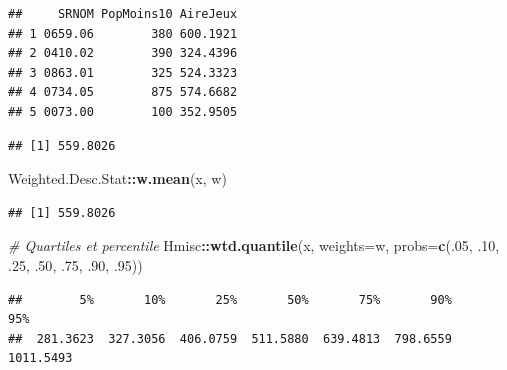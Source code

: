 \documentclass[
  11pt,
  french,
]{book}
\makeatletter
\newenvironment{Shaded}{\begin{snugshade}}{\end{snugshade}}
\newcommand{\CommentTok}[1]{\textcolor[rgb]{0.56,0.35,0.01}{\textit{#1}}}
\newcommand{\DataTypeTok}[1]{\textcolor[rgb]{0.13,0.29,0.53}{#1}}
\newcommand{\DecValTok}[1]{\textcolor[rgb]{0.00,0.00,0.81}{#1}}
\newcommand{\FloatTok}[1]{\textcolor[rgb]{0.00,0.00,0.81}{#1}}
\newcommand{\KeywordTok}[1]{\textcolor[rgb]{0.13,0.29,0.53}{\textbf{#1}}}
\newcommand{\NormalTok}[1]{#1}
\newcommand{\OperatorTok}[1]{\textcolor[rgb]{0.81,0.36,0.00}{\textbf{#1}}}
\newcommand{\StringTok}[1]{\textcolor[rgb]{0.31,0.60,0.02}{#1}}
\newenvironment{kframe}{%
\medskip{}
\setlength{\fboxsep}{.8em}
 \def\at@end@of@kframe{}%
 \ifinner\ifhmode%
  \def\at@end@of@kframe{\end{minipage}}%
  \begin{minipage}{\columnwidth}%
 \fi\fi%
 \def\FrameCommand##1{\hskip\@totalleftmargin \hskip-\fboxsep
 \colorbox{shadecolor}{##1}\hskip-\fboxsep
     \hskip-\linewidth \hskip-\@totalleftmargin \hskip\columnwidth}%
 \MakeFramed {\advance\hsize-\width
   \@totalleftmargin\z@ \linewidth\hsize
   \@setminipage}}%
 {\par\unskip\endMakeFramed%
 \at@end@of@kframe}
\renewenvironment{Shaded}{\begin{kframe}}{\end{kframe}}
\makeatother
\begin{document}
\begin{verbatim}
##     SRNOM PopMoins10 AireJeux
## 1 0659.06        380 600.1921
## 2 0410.02        390 324.4396
## 3 0863.01        325 524.3323
## 4 0734.05        875 574.6682
## 5 0073.00        100 352.9505
\end{verbatim}

\begin{Shaded}
\end{Shaded}

\begin{verbatim}
## [1] 559.8026
\end{verbatim}

\begin{Shaded}
\begin{Highlighting}[]
\NormalTok{Weighted.Desc.Stat}\OperatorTok{::}\KeywordTok{w.mean}\NormalTok{(x, w)}
\end{Highlighting}
\end{Shaded}

\begin{verbatim}
## [1] 559.8026
\end{verbatim}

\begin{Shaded}
\begin{Highlighting}[]
\CommentTok{# Quartiles et percentile}
\NormalTok{Hmisc}\OperatorTok{::}\KeywordTok{wtd.quantile}\NormalTok{(x, }\DataTypeTok{weights=}\NormalTok{w, }\DataTypeTok{probs=}\KeywordTok{c}\NormalTok{(.}\DecValTok{05}\NormalTok{, }\FloatTok{.10}\NormalTok{, }\FloatTok{.25}\NormalTok{, }\FloatTok{.50}\NormalTok{, }\FloatTok{.75}\NormalTok{, }\FloatTok{.90}\NormalTok{, }\FloatTok{.95}\NormalTok{))}
\end{Highlighting}
\end{Shaded}

\begin{verbatim}
##        5%       10%       25%       50%       75%       90%       95% 
##  281.3623  327.3056  406.0759  511.5880  639.4813  798.6559 1011.5493
\end{verbatim}
\end{document}
